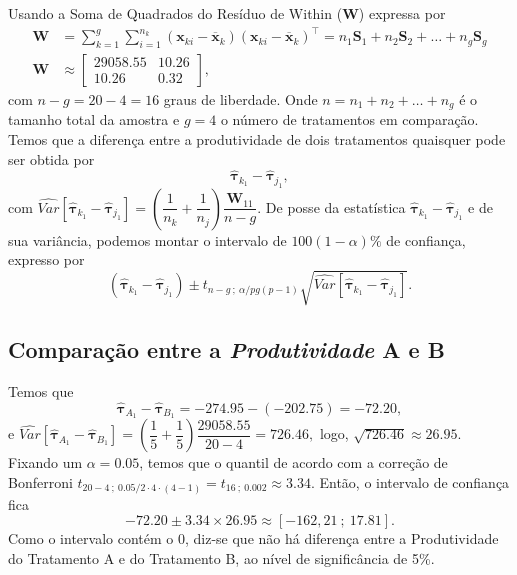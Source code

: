 Usando a Soma de Quadrados do Resíduo de Within ($\mathbf{W}$) expressa por
\begin{align*}
    \mathbf{W} & = \sum_{k=1}^{g} \sum_{i=1}^{n_{k}} (\mathbf{x}_{ki} - \overline{\mathbf{x}}_{k})(\mathbf{x}_{ki} - \overline{\mathbf{x}}_{k})^{\intercal} = n_{1} \mathbf{S}_{1} + n_{2} \mathbf{S}_{2} + \ldots + n_{g} \mathbf{S}_{g} \\
    \mathbf{W} & \approx \begin{bmatrix}  29058.55 & 10.26 \\ 10.26 & 0.32  \end{bmatrix}, \text{} 
\end{align*}
com $n - g = 20 - 4 = 16$ graus de liberdade. Onde $n = n_{1} + n_{2} + \ldots + n_{g}$ é o tamanho total da amostra e $g = 4$ o número de tratamentos em comparação. Temos que a diferença entre a produtividade de dois tratamentos quaisquer pode ser obtida por $$\boldsymbol{\widehat{\tau}}_{k_{1}} - \boldsymbol{\widehat{\tau}}_{j_{1}},$$ com $\widehat{Var}\left[\boldsymbol{\widehat{\tau}}_{k_{1}} - \boldsymbol{\widehat{\tau}}_{j_{1}}\right] = \left( \dfrac{1}{n_{k}} + \dfrac{1}{n_{j}} \right) \dfrac{\mathbf{W}_{11}}{n - g}$. De posse da estatística $\boldsymbol{\widehat{\tau}}_{k_{1}} - \boldsymbol{\widehat{\tau}}_{j_{1}}$ e de sua variância, podemos montar o intervalo de $100(1 - \alpha)\%$ de confiança, expresso por $$(\boldsymbol{\widehat{\tau}}_{k_{1}} - \boldsymbol{\widehat{\tau}}_{j_{1}}) \pm t_{n-g \ ; \ \alpha/pg (p -1)} \sqrt{\widehat{Var}\left[\boldsymbol{\widehat{\tau}}_{k_{1}} - \boldsymbol{\widehat{\tau}}_{j_{1}}\right]}.$$

\subsection*{Comparação entre a \textit{Produtividade} A e B}

Temos que $$\boldsymbol{\widehat{\tau}}_{A_{1}} - \boldsymbol{\widehat{\tau}}_{B_{1}} = -274.95 - (-202.75) = -72.20,$$ e $\widehat{Var}\left[\boldsymbol{\widehat{\tau}}_{A_{1}} - \boldsymbol{\widehat{\tau}}_{B_{1}}\right] = \left( \dfrac{1}{5} + \dfrac{1}{5} \right) \dfrac{29058.55}{20 - 4} = 726.46,$ logo, $\sqrt{726.46} \approx 26.95$. Fixando um $\alpha = 0.05$, temos que o quantil de acordo com a correção de Bonferroni $t_{20-4 \ ; \ 0.05/2 \cdot 4 \cdot (4-1)} = t_{16 \ ; \ 0.002} \approx 3.34$. Então, o intervalo de confiança fica $$-72.20 \pm 3.34 \times 26.95 \approx [-162,21 \ ; \ 17.81].$$ Como o intervalo contém o $0$, diz-se que não há diferença entre a Produtividade do Tratamento A e do Tratamento B, ao nível de significância de 5\%.

